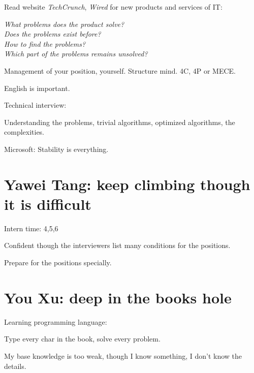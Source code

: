 \label{sec:3}

Read website \emph{TechCrunch}, \emph{Wired} for new products and services of IT:

\textit{What problems does the product solve?\\
\indent
Does the problems exist before?\\
\indent
How to find the problems?\\
\indent
Which part of the problems remains unsolved?}

Management of your position, yourself. Structure mind. 4C, 4P or MECE.

English is important.

Technical interview:

Understanding the problems, trivial algorithms, optimized algorithms, the complexities.

Microsoft: Stability is everything.

\section{Yawei Tang: keep climbing though it is difficult}
\label{sec:4}

Intern time: 4,5,6

Confident though the interviewers list many conditions for the positions.

Prepare for the positions specially.

\section{You Xu: deep in the books hole}
\label{sec:5}

Learning programming language:

Type every char in the book, solve every problem.

My base knowledge is too weak, though I know something, I don't know the details.


